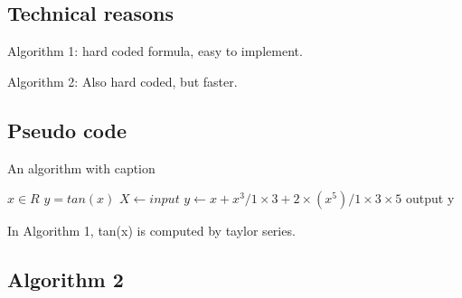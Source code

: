 \documentclass[10pt,a4paper,twoside]{article}
\begin{document}
\begin{algorithm}
\subsection{Technical reasons}
\begin{item}
\item
Algorithm 1: hard coded formula, easy to implement.
\item
Algorithm 2: Also hard coded, but faster.
\end{item}
\subsection{Pseudo code}
\caption{An algorithm with caption}\label{alg:cap}
\begin{algorithmic}
\Require $x \in R$
\Ensure $y = tan(x)$
\State $X \gets input$
    \State $y \gets x+x^3/1\times3+2\times( x^5)/1\times3\times5$
    \State output y
\EndWhile
\end{algorithmic}
\end{algorithm}



In Algorithm 1, tan(x) is computed by taylor series.
\subsection{Algorithm 2}



\end{document}
